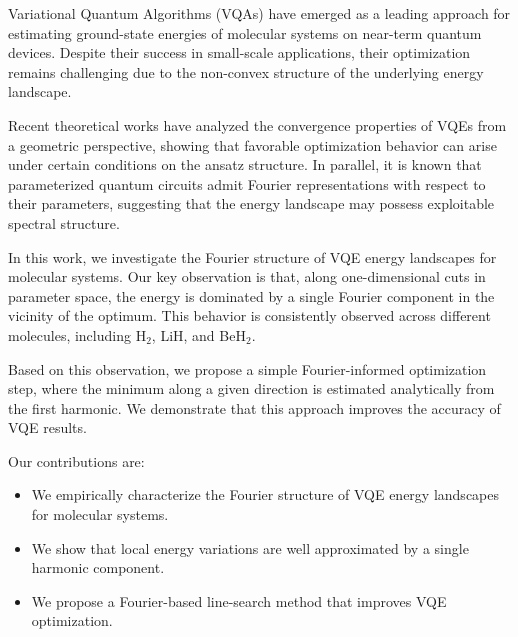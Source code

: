 \documentclass[12pt]{article}
\begin{document}


Variational Quantum Algorithms (VQAs) have emerged as a leading approach for estimating ground-state energies of molecular systems on near-term quantum devices. Despite their success in small-scale applications, their optimization remains challenging due to the non-convex structure of the underlying energy landscape.

Recent theoretical works have analyzed the convergence properties of VQEs from a geometric perspective, showing that favorable optimization behavior can arise under certain conditions on the ansatz structure. In parallel, it is known that parameterized quantum circuits admit Fourier representations with respect to their parameters, suggesting that the energy landscape may possess exploitable spectral structure.

In this work, we investigate the Fourier structure of VQE energy landscapes for molecular systems. Our key observation is that, along one-dimensional cuts in parameter space, the energy is dominated by a single Fourier component in the vicinity of the optimum. This behavior is consistently observed across different molecules, including H$_2$, LiH, and BeH$_2$.

Based on this observation, we propose a simple Fourier-informed optimization step, where the minimum along a given direction is estimated analytically from the first harmonic. We demonstrate that this approach improves the accuracy of VQE results.

Our contributions are:
\begin{itemize}
    \item We empirically characterize the Fourier structure of VQE energy landscapes for molecular systems.
    \item We show that local energy variations are well approximated by a single harmonic component.
    \item We propose a Fourier-based line-search method that improves VQE optimization.
\end{itemize}
\end{document}
